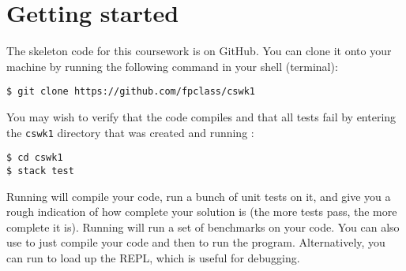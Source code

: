 
\section{Getting started}

The skeleton code for this coursework is on GitHub. You can clone it onto your machine by running the following command in your shell (terminal):
\begin{verbatim}
$ git clone https://github.com/fpclass/cswk1
\end{verbatim}
You may wish to verify that the code compiles and that all tests fail by entering the \texttt{\small cswk1} directory that was created and running :
\begin{verbatim}
$ cd cswk1
$ stack test
\end{verbatim}
Running  will compile your code, run a bunch of unit tests on it, and give you a rough indication of how complete your solution is (the more tests pass, the more complete it is). Running  will run a set of benchmarks on your code. You can also use  to just compile your code and then  to run the program. Alternatively, you can run  to load up the REPL, which is useful for debugging.

